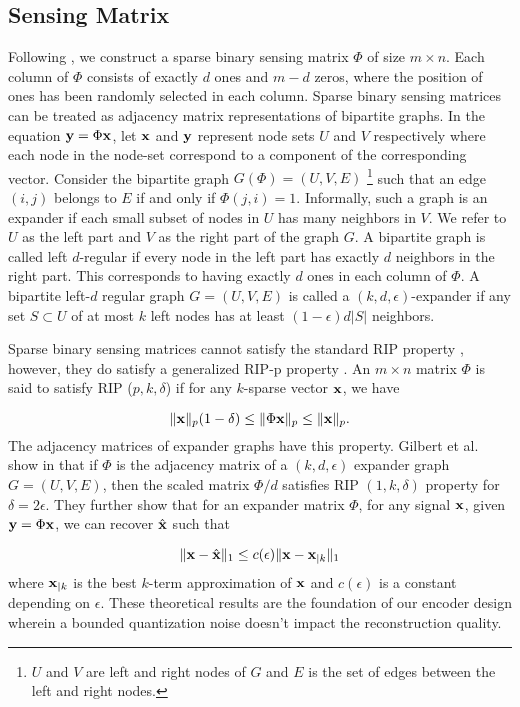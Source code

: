 \subsection{Sensing Matrix}
Following \cite{mamaghanian2011compressed},
we construct a sparse binary sensing matrix $\Phi$ of size
$m \times n$.
Each column of $\Phi$ consists of exactly $d$ ones and
$m-d$ zeros, where the position of ones has been randomly
selected in each column.
Sparse binary sensing matrices can be treated as adjacency 
matrix representations of bipartite graphs.
In the equation $\mathbf{y} = \Phi \mathbf{x}$, let $\mathbf{x}$
and $\mathbf{y}$ represent node sets $U$ and $V$
respectively where each node in the node-set
correspond to a component of the corresponding vector.
Consider the bipartite graph $G (\Phi) = (U, V, E)$
\footnote{$U$ and $V$ are left and right nodes of $G$
and $E$ is the set of edges between the left and right nodes.}
such that
an edge $(i, j)$ belongs to $E$ if and only if
$\Phi(j, i) = 1$. Informally, such a graph is
an expander \cite{gilbert2010sparse}
if each small subset of nodes in $U$ has many neighbors
in $V$. We refer to $U$ as the left part and $V$
as the right part of the graph $G$.
A bipartite graph is called left $d$-regular
if every node in the left part has exactly
$d$ neighbors in the right part. This corresponds to having
exactly $d$ ones in each column of $\Phi$.
A bipartite left-$d$ regular graph $G = (U, V, E)$
is called a $(k, d, \epsilon)$-expander if any
set $S \subset U$ of at most $k$ left nodes has
at least $(1-\epsilon)d|S|$ neighbors.

Sparse binary sensing matrices cannot satisfy the standard RIP
property \cite{candes2008restricted},
however, they do satisfy a generalized
RIP-p property \cite{gilbert2010sparse}.
An $m \times n$ matrix $\Phi$ is said to satisfy
RIP ($p, k, \delta$) if for any $k$-sparse vector
$\mathbf{x}$, we have

\begin{equation}
\| \mathbf{x} \|_p (1 - \delta) \leq \| \Phi \mathbf{x} \|_p \leq \| \mathbf{x} \|_p.
\end{equation}
The adjacency matrices of expander graphs have
this property. Gilbert et al. show in \cite{gilbert2010sparse}
that if $\Phi$ is the adjacency matrix of a $(k,d, \epsilon)$
expander graph $G = (U, V, E)$, then the scaled matrix
$\Phi / d$ satisfies RIP $(1,k, \delta)$ property for
$\delta = 2 \epsilon$.
They further show that for an expander matrix $\Phi$,
for any signal $\mathbf{x}$, given $\mathbf{y} = \Phi \mathbf{x}$, we
can recover $\hat{\mathbf{x}}$ such that

$$
\| \mathbf{x} - \hat{\mathbf{x}} \|_1 \leq c(\epsilon) \| \mathbf{x} - \mathbf{x}_{|k} \|_1
$$
where $\mathbf{x}_{|k}$ is the best $k$-term approximation of $\mathbf{x}$
and $c(\epsilon)$ is a constant depending on $\epsilon$.
These theoretical results are the foundation of our encoder
design wherein a bounded quantization noise doesn't impact
the reconstruction quality. 

